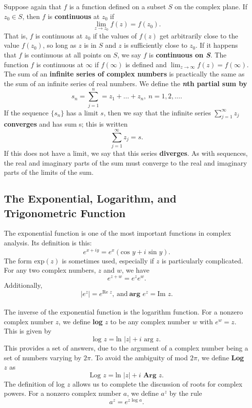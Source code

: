 \documentclass[12pt,letterpaper]{article}
\begin{document}
Suppose again that \(f\) is a function defined on a subset \(S\) on the complex plane. If \(z_{0} \in S\), then \(f\) is \textbf{continuous} at \(z_{0}\) if \[\lim_{z \to z_{0}} f(z) = f(z_{0}).\] That is, \(f\) is continuous at \(z_{0}\) if the values of \(f(z)\) get arbitrarily close to the value \(f(z_{0})\), so long as \(z\) is in \(S\) and \(z\) is sufficiently close to \(z_{0}\). If it happens that \(f\) is continuous at all points on \(S\), we say \(f\) is \textbf{continuous on \textit{S}}. The function \(f\) is continuous at \(\infty\) if \(f(\infty)\) is defined and \(\lim_{z \to \infty} f(z) = f(\infty)\). \\

The sum of an \textbf{infinite series of complex numbers} is 
practically the same as the sum of an infinite series of real numbers. We define the \textbf{\textit{n}th partial sum by} \[s_{n} = \sum\limits_{j = 1}^{n} = z_{1} + ... + z_{n},\ n = 1,2,... .\]  If the sequence \(\{s_{n}\}\) has a limit \(s\), then we say that the infinite series \(\sum\limits_{j = 1}^{\infty} z_{j}\) \textbf{converges} and has sum s; this is written \[\sum\limits_{j = 1}^{\infty} z_{j} = s.\] If this does not have a limit, we say that this series \textbf{diverges}. As with sequences, the real and imaginary parts of the sum must converge to the real and imaginary parts of the limits of the sum.

\subsection{The Exponential, Logarithm, and Trigonometric Function}

The exponential function is one of the most important functions in complex analysis. Its definition is this: \[e^{x + iy} = e^{x}(\text{cos }y + i\text{ sin }y).\] The form \(\text{exp}(z)\) is sometimes used, especially if \(z\) is particularly complicated. For any two complex numbers, \(z\) and \(w\), we have \[e^{z + w} = e^{z}e^{w}.\] Additionally, \[|e^{z}| = e^{\text{Re } z},\ \text{and}\ \textbf{arg } e^{z} = \text{Im } z.\] \\

The inverse of the exponential function is the logarithm function. For a nonzero complex number \(z\), we define \textbf{log} \(z\) to be any complex number \(w\) with \(e^{w} = z\). This is given by \[\text{log } z = \text{ln } |z| + i \text{ arg } z.\] This provides a set of answers, due to the argument of a complex number being a set of numbers varying by \(2\pi\). To avoid the ambiguity of mod \(2\pi\), we define \textbf{Log \(z\)} as \[\text{Log } z = \text{ln } |z| + i \textbf{ Arg } z.\] The definition of log \(z\) allows us to complete the discussion of roots for complex powers. For a nonzero complex number \(a\), we define \(a^{z}\) by the rule \[a^{z} = e^{z\text{ log }a}.\] \\
\end{document}
